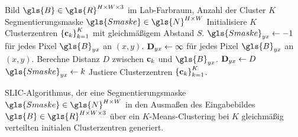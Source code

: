 \begin{algorithm}[t]
\centering
\begin{algorithmic}
  \REQUIRE{} Bild $\gls{B} \in \gls{R}^{H \times W \times 3}$ im Lab-Farbraum, Anzahl der Cluster $K$
  \ENSURE{} Segmentierungsmaske $\gls{Smaske} \in \gls{N}^{H \times W}$
  \STATE{} Initialisiere $K$ Clusterzentren ${\left\{\ve{c}_k\right\}}_{k=1}^K$ mit gleichmäßigem Abstand $S$.
  \STATE{} $\gls{Smaske}_{yx} \leftarrow -1$ für jedes Pixel $\gls{B}_{yx}$ an $\left(x,y\right)$.
  \STATE{} $\mathbf{D}_{yx} \leftarrow \infty$ für jedes Pixel $\gls{B}_{yx}$ an $\left(x,y\right)$.
  \REPEAT{}
        \STATE{} Berechne Distanz $D$ zwischen $\mathbf{c}_k$ und $\gls{B}_{yx}$.
          \STATE{} $\mathbf{D}_{yx} \leftarrow D$
          \STATE{} $\gls{Smaske}_{yx} \leftarrow k$
        \ENDIF{}
      \ENDFOR{}
    \ENDFOR{}
    \STATE{} Justiere Clusterzentren ${\left\{\ve{c}_k\right\}}_{k=1}^K$.
\end{algorithmic}
  \caption[\gls{SLIC}]{\gls{SLIC}-Algorithmus, der eine Segmentierungsmaske $\gls{Smaske} \in \gls{N}^{H \times W}$ in den Ausmaßen des Eingabebildes $\gls{B} \in \gls{R}^{H \times W \times 3}$ über ein $K$-Means-Clustering bei $K$ gleichmäßig verteilten initialen Clusterzentren generiert.}
\label{alg:slic}
\end{algorithm}

